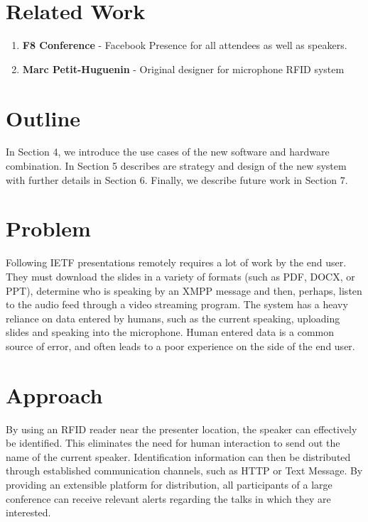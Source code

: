 \documentclass{article}
\begin{document}
\section{Related Work}
	
	\begin{enumerate}
	\item {\bf F8 Conference} - 
	Facebook Presence for all attendees as well as speakers.

	\item {\bf Marc Petit-Huguenin} - 
	Original designer for microphone RFID system
	\end{enumerate}

\section{Outline}
	  In Section 4, we introduce the use cases of the new software and hardware combination. 
          In Section 5 describes are strategy and design of the new system with further details in Section 6. 
          Finally, we describe future work in Section 7.

\section{Problem}
          Following IETF presentations remotely requires a lot of work by the end user. 
          They must download the slides in a variety of formats (such as PDF, DOCX, or PPT), 
          determine who is speaking by an XMPP message and then, perhaps, listen to the audio feed 
          through a video streaming program. 
          The system has a heavy reliance on data entered by humans, such as the current speaking, 
          uploading slides and speaking into the microphone. 
          Human entered data is a common source of error, and often leads to a poor experience on the side of the end user.

\section{Approach}
	By using an RFID reader near the presenter location, the speaker can effectively be identified. 
        This eliminates the need for human interaction to send out the name of the current speaker. 
        Identification information can then be distributed through established communication channels, 
        such as HTTP or Text Message.  By providing an extensible platform for distribution, all
        participants of a large conference can receive relevant alerts regarding the talks in which 
        they are interested. 
\end{document}
